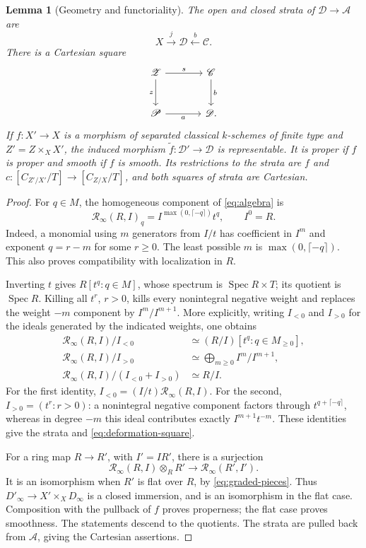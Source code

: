\documentclass[11pt,a4paper]{article}
\newcommand{\Spec}{\operatorname{Spec}}
\newcommand{\cA}{\mathscr A}
\newcommand{\cD}{\mathscr D}
\newcommand{\cC}{\mathscr C}
\newcommand{\cP}{\mathscr P}
\newcommand{\cZ}{\mathscr Z}
\newcommand{\Rinf}{\mathcal R_\infty}
\theoremstyle{notes}
\newtheorem{geom}{Lemma}[section]
\begin{document}
\begin{geom}[Geometry and functoriality]\label{lem:geometry}
The open and closed strata of $\cD\to\cA$ are
\[
X\xrightarrow{\ j\ }\cD\xleftarrow{\ b\ }\cC.
\]
There is a Cartesian square
\begin{equation}\label{eq:deformation-square}
\begin{tikzcd}[column sep=large,row sep=large]
\cZ\ar[r,"s"]\ar[d,"z"']&\cC\ar[d,"b"]\\
\cP\ar[r,"a"']&\cD.
\end{tikzcd}
\end{equation}
If $f:X'\to X$ is a morphism of separated classical $k$-schemes of finite type and $Z'=Z\times_X X'$, the induced morphism $\widetilde f:\cD'\to\cD$ is representable. It is proper if $f$ is proper and smooth if $f$ is smooth. Its restrictions to the strata are $f$ and $c:[C_{Z'/X'}/T]\to[C_{Z/X}/T]$, and both squares of strata are Cartesian.
\end{geom}

\begin{proof}
For $q\in M$, the homogeneous component of \eqref{eq:algebra} is
\begin{equation}\label{eq:graded-pieces}
\Rinf(R,I)_q=I^{\max(0,\lceil-q\rceil)}t^q,\qquad I^0=R.
\end{equation}
Indeed, a monomial using $m$ generators from $I/t$ has coefficient in $I^m$ and exponent $q=r-m$ for some $r\geq0$. The least possible $m$ is $\max(0,\lceil-q\rceil)$. This also proves compatibility with localization in $R$.

Inverting $t$ gives $R[t^q:q\in M]$, whose spectrum is $\Spec R\times T$; its quotient is $\Spec R$. Killing all $t^r$, $r>0$, kills every nonintegral negative weight and replaces the weight $-m$ component by $I^m/I^{m+1}$. More explicitly, writing $I_{<0}$ and $I_{>0}$ for the ideals generated by the indicated weights, one obtains
\begin{equation}\label{eq:signed-quotients}
\begin{aligned}
\Rinf(R,I)/I_{<0}&\simeq(R/I)[t^q:q\in M_{\geq0}],\\
\Rinf(R,I)/I_{>0}&\simeq\bigoplus_{m\geq0}I^m/I^{m+1},\\
\Rinf(R,I)/(I_{<0}+I_{>0})&\simeq R/I.
\end{aligned}
\end{equation}
For the first identity, $I_{<0}=(I/t)\Rinf(R,I)$. For the second, $I_{>0}=(t^r:r>0)$: a nonintegral negative component factors through $t^{q+\lceil-q\rceil}$, whereas in degree $-m$ this ideal contributes exactly $I^{m+1}t^{-m}$. These identities give the strata and \eqref{eq:deformation-square}.

For a ring map $R\to R'$, with $I'=IR'$, there is a surjection
\[
\Rinf(R,I)\otimes_R R'\longrightarrow\Rinf(R',I').
\]
It is an isomorphism when $R'$ is flat over $R$, by \eqref{eq:graded-pieces}. Thus $D'_\infty\to X'\times_X D_\infty$ is a closed immersion, and is an isomorphism in the flat case. Composition with the pullback of $f$ proves properness; the flat case proves smoothness. The statements descend to the quotients. The strata are pulled back from $\cA$, giving the Cartesian assertions.
\end{proof}
\end{document}
